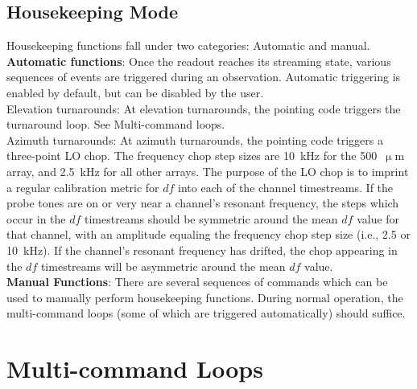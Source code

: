 \subsection{Housekeeping Mode}
Housekeeping functions fall under two categories: Automatic and manual.\\

\noindent \textbf{Automatic functions}:
Once the readout reaches its streaming state, various sequences of events are triggered during an observation. Automatic triggering is enabled by default, but can be disabled by the user.\\

Elevation turnarounds: At elevation turnarounds, the pointing code triggers the turnaround loop. See Multi-command loops.\\

Azimuth turnarounds: At azimuth turnarounds, the pointing code triggers a three-point LO chop. The frequency chop step sizes are 10~kHz for the 500~$\upmu$m array, and 2.5~kHz for all other arrays. The purpose of the LO chop is to imprint a regular calibration metric for $df$ into each of the channel timestreams. If the probe tones are on or very near a channel’s resonant frequency, the steps which occur in the $df$ timestreams should be symmetric around the mean $df$ value for that channel, with an amplitude equaling the frequency chop step size (i.e., 2.5 or 10~kHz). If the channel's resonant frequency has drifted, the chop appearing in the $df$ timestreams will be asymmetric around the mean $df$ value.\\

\noindent \textbf{Manual Functions}:
There are several sequences of commands which can be used to manually perform housekeeping functions. During normal operation, the multi-command loops (some of which are triggered automatically) should suffice.

\section{Multi-command Loops}\label{multiloops}

